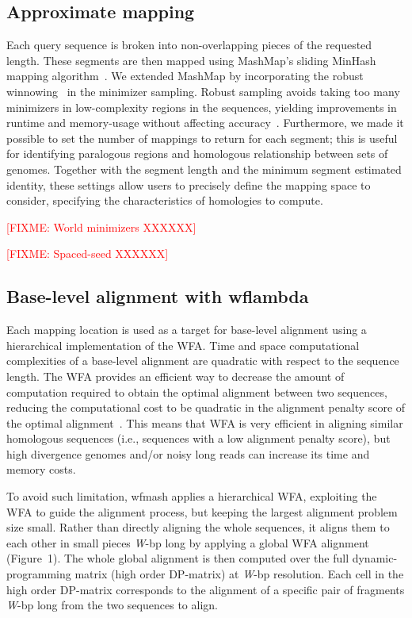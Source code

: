 \documentclass{bioinfo}
\theoremstyle{definition}
\newcommand{\red}[1]{{\textcolor{Red}{#1}}}
\newcommand{\FIXME}[1]{\red{[FIXME: #1]}}
\begin{document}
\subsection{Approximate mapping}
Each query sequence is broken into non-overlapping pieces of the requested length.
These segments are then mapped using MashMap's sliding MinHash mapping algorithm~\citep{Jain_2018}.
We extended MashMap by incorporating the robust winnowing~\citep{Schleimer2003} in the minimizer sampling.
Robust sampling avoids taking too many minimizers in low-complexity regions in the sequences, yielding improvements in runtime and memory-usage without affecting accuracy~\citep{Jain_2020}.
Furthermore, we made it possible to set the number of mappings to return for each segment; this is useful for identifying paralogous regions and homologous relationship between sets of genomes.
Together with the segment length and the minimum segment estimated identity, these settings allow users to precisely define the mapping space to consider, specifying the characteristics of homologies to compute.

\FIXME{World minimizers XXXXXX}

\FIXME{Spaced-seed XXXXXX}


\subsection{Base-level alignment with wflambda}
Each mapping location is used as a target for base-level alignment using a hierarchical implementation of the WFA.
Time and space computational complexities of a base-level alignment are quadratic with respect to the sequence length.
The WFA provides an efficient way to decrease the amount of computation required to obtain the optimal alignment between two sequences, reducing the computational cost to be quadratic in the alignment penalty score of the optimal alignment~\citep{Marco_Sola_2020}.
This means that WFA is very efficient in aligning similar homologous sequences (i.e., sequences with a low alignment penalty score), but high divergence genomes and/or noisy long reads can increase its time and memory costs.

To avoid such limitation, wfmash applies a hierarchical WFA, exploiting the WFA to guide the alignment process, but keeping the largest alignment problem size small.
Rather than directly aligning the whole sequences, it aligns them to each other in small pieces \textit{W}-bp long by applying a global WFA alignment (Figure~1\vphantom{\ref{fig:1}}).
The whole global alignment is then computed over the full dynamic-programming matrix (high order DP-matrix) at \textit{W}-bp resolution.
Each cell in the high order DP-matrix corresponds to the alignment of a specific pair of fragments \textit{W}-bp long from the two sequences to align.
\end{document}
